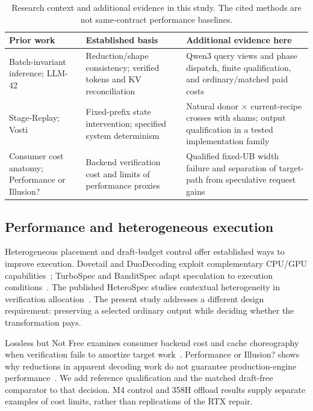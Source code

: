 \begin{table}[t]\centering\small
\caption{Research context and additional evidence in this study. The cited methods are not same-contract performance baselines.}
\label{tab:related}
\begin{tabularx}{\linewidth}{@{}p{.23\linewidth}XX@{}}\toprule
Prior work & Established basis & Additional evidence here\\\midrule
Batch-invariant inference; LLM-42~\cite{thinkingmachines,llm42} & Reduction/shape consistency; verified tokens and KV reconciliation & Qwen3 query views and phase dispatch, finite qualification, and ordinary/matched paid costs\\
Stage-Replay; Vosti~\cite{stagereplay,vosti} & Fixed-prefix state intervention; specified system determinism & Natural donor $\times$ current-recipe crosses with shams; output qualification in a tested implementation family\\
Consumer cost anatomy; Performance or Illusion?~\cite{lossless,illusion} & Backend verification cost and limits of performance proxies & Qualified fixed-UB width failure and separation of target-path from speculative request gains\\\bottomrule
\end{tabularx}
\end{table}

\subsection{Performance and heterogeneous execution}
Heterogeneous placement and draft-budget control offer established ways to improve execution. Dovetail and DuoDecoding exploit complementary CPU/GPU capabilities~\cite{dovetail,duodecoding}; TurboSpec and BanditSpec adapt speculation to execution conditions~\cite{turbospec,banditspec}. The published HeteroSpec studies contextual heterogeneity in verification allocation~\cite{aclheterospec}. The present study addresses a different design requirement: preserving a selected ordinary output while deciding whether the transformation pays.

Lossless but Not Free examines consumer backend cost and cache choreography when verification fails to amortize target work~\cite{lossless}. Performance or Illusion? shows why reductions in apparent decoding work do not guarantee production-engine performance~\cite{illusion}. We add reference qualification and the matched draft-free comparator to that decision. M4 control and 358H offload results supply separate examples of cost limits, rather than replications of the RTX repair.
